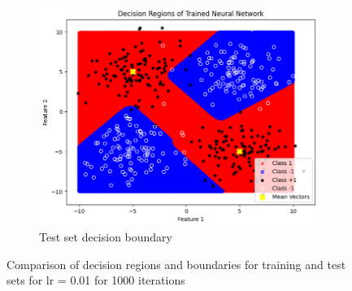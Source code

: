 \documentclass[a4paper,12pt]{article}
\begin{document}
\begin{figure}[H]
    \begin{subfigure}{0.45\textwidth}
        \centering
        \includegraphics[width=\textwidth]{3.3_.01_1000_Test.png}
        \caption{Test set decision boundary}
    \end{subfigure}

    \caption{Comparison of decision regions and boundaries for training and test sets for lr = 0.01 for 1000 iterations}
\end{figure}
\end{document}
